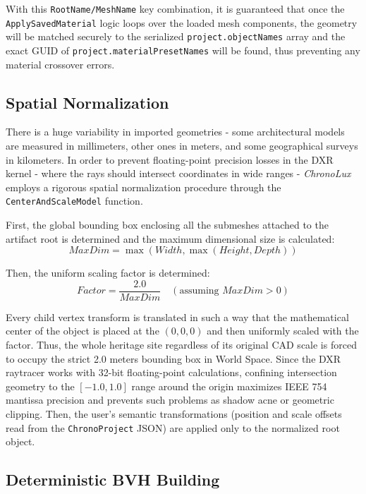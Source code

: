 With this \texttt{RootName/MeshName} key combination, it is guaranteed that once the \texttt{ApplySavedMaterial} logic loops over the loaded mesh components, the geometry will be matched securely to the serialized \texttt{project.objectNames} array and the exact GUID of \texttt{project.materialPresetNames} will be found, thus preventing any material crossover errors.

\subsection{Spatial Normalization}

There is a huge variability in imported geometries - some architectural models are measured in millimeters, other ones in meters, and some geographical surveys in kilometers. In order to prevent floating-point precision losses in the DXR kernel - where the rays should intersect coordinates in wide ranges - \textit{ChronoLux} employs a rigorous spatial normalization procedure through the \texttt{CenterAndScaleModel} function.

First, the global bounding box enclosing all the submeshes attached to the artifact root is determined and the maximum dimensional size is calculated:
\begin{equation}
    MaxDim = \max(Width, \max(Height, Depth))
\end{equation}

Then, the uniform scaling factor is determined:
\begin{equation}
    Factor = \frac{2.0}{MaxDim} \quad (\text{assuming } MaxDim > 0)
\end{equation}

Every child vertex transform is translated in such a way that the mathematical center of the object is placed at the $(0, 0, 0)$ and then uniformly scaled with the factor. Thus, the whole heritage site regardless of its original CAD scale is forced to occupy the strict 2.0 meters bounding box in World Space. Since the DXR raytracer works with 32-bit floating-point calculations, confining intersection geometry to the $[-1.0, 1.0]$ range around the origin maximizes IEEE 754 mantissa precision and prevents such problems as shadow acne or geometric clipping. Then, the user’s semantic transformations (position and scale offsets read from the \texttt{ChronoProject} JSON) are applied only to the normalized root object.

\subsection{Deterministic BVH Building}

